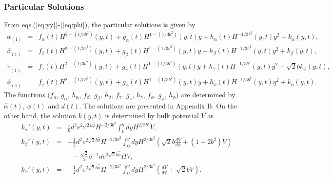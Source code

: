 \documentclass[a4paper,11pt]{article}
\begin{document}
\subsubsection{Particular Solutions}

From eqs.(\ref{eq:yy})-(\ref{eq:phi}), the particular solutions is given by 
\begin{eqnarray}
\alpha_{(1)} &=& f_{\alpha}(t)H^{2-(1/3b^2)}(y,t)
                 +g_{\alpha}(t)H^{1-(1/3b^2)}(y,t)y
                 +h_{\alpha}(t)H^{-1/3b^2}(y,t) y^2
                 +k_{\alpha}(y,t), 
\label{eq:particular_alpha} \\
\beta_{(1)} &=& f_{\beta}(t)H^{2-(1/3b^2)}(y,t)
                 +g_{\beta}(t)H^{1-(1/3b^2)}(y,t)y
                 +h_{\beta}(t)H^{-1/3b^2}(y,t) y^2 
                 +k_{\beta}(y,t), 
\label{eq:particular_beta} \\
\gamma_{(1)} &=& f_{\gamma}(t)H^{2-(1/3b^2)}(y,t)
                 +g_{\gamma}(t)H^{1-(1/3b^2)}(y,t)y
                 +h_{\gamma}(t)H^{-1/3b^2}(y,t) y^2
                 +\sqrt{2}bk_{\phi}(y,t), 
\label{eq:particular_gamma} \\
\phi_{(1)} &=& f_{\phi}(t)H^{2-(1/3b^2)}(y,t)
                 +g_{\phi}(t)H^{1-(1/3b^2)}(y,t)y
                 +h_{\phi}(t)H^{-1/3b^2}(y,t) y^2
                 +k_{\phi}(y,t). 
\label{eq:particular_phi}
\end{eqnarray}
The functions $(f_{\alpha}$, $g_{\alpha}$, 
$h_{\alpha}$, $f_{\beta}$, 
$g_{\beta}$, $h_{\beta}$, $f_{\gamma}$, $g_{\gamma}$, $h_{\gamma}$, 
$f_{\phi}$, 
$g_{\phi}$, $h_{\phi})$
are determined by $\hat{\alpha}(t), \ \hat{\phi}(t)$ and $d(t)$.
The solutions are presented in Appendix B. 
On the other hand, the solution $k(y,t)$ is determined by
bulk potential $V$ as 
\begin{eqnarray}
k_{\alpha}'(y,t) &=& \frac{1}{6} d^2 e^{2 \sqrt{2} b \hat{\phi}} 
H^{-2/3b^2} \int^y_0 dy H^{2/3 b^2} V,   \\ 
k_{\beta}'(y,t) &=&  -\frac{1}{2} d^2 e^{2 \sqrt{2} b \hat{\phi}}
H^{-2/3b^2} \int^y_0 dy H^{2/3 b^2} \left( 
\sqrt{2}b\frac{d V}{d \phi} + (1+2b^2) V \right) \nonumber  \\
& &\mbox{ }-\frac{\sqrt{2}}{2}\sigma^{-1}d e^{2\sqrt{2}b\hat{\phi}}H V, \\
k_{\phi}'(y,t) &=& -\frac{1}{2} d^2 e^{2 \sqrt{2} b \hat{\phi}} 
H^{-2/3b^2} \int^y_0 dy H^{2/3 b^2} \left( 
\frac{d V}{d \phi} + \sqrt{2} b V \right). 
\end{eqnarray}
\end{document}
